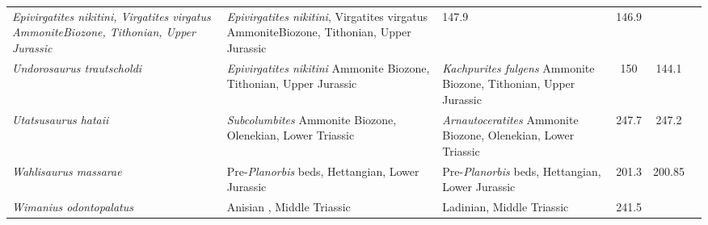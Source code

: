 \begin{longtabu}{>{\itshape}lXXSSl}
        \emph{Epivirgatites nikitini}, Virgatites virgatus AmmoniteBiozone,
        Tithonian, Upper Jurassic                                      &
        \emph{Epivirgatites nikitini}, Virgatites virgatus AmmoniteBiozone,
        Tithonian, Upper Jurassic                                      & 147.9
                                                                       & 146.9
                                                                       &
                                                                       \cite{Efimov1999PZd} \\                    
	Undorosaurus trautscholdi                            &
        \emph{Epivirgatites nikitini} Ammonite Biozone, Tithonian, Upper
        Jurassic                                                          &
        \emph{Kachpurites fulgens} Ammonite Biozone, Tithonian, Upper Jurassic
                                                                          & 150
                                                                          &
        144.1                    & \cite{Arkhangelsky2014PZIR} \\               
	Utatsusaurus hataii                                  &
        \emph{Subcolumbites} Ammonite Biozone, Olenekian, Lower Triassic
                                                             &
        \emph{Arnautoceratites} Ammonite Biozone, Olenekian, Lower Triassic
                                                             & 247.7
                                                             & 247.2
                                                             &
                                                             \cite{Shikama1978SRTUGa} \\                    
	Wahlisaurus massarae                                 &
        Pre-\emph{Planorbis} beds, Hettangian, Lower Jurassic
                                                             &
        Pre-\emph{Planorbis} beds, Hettangian, Lower Jurassic
                                                             & 201.3
                                                             & 200.85
                                                             &
                                                             \cite{Lomax2016JSP} \\                      
	Wimanius odontopalatus                               & Anisian , Middle
        Triassic
                                                             & Ladinian, Middle
        Triassic
                                                             & 241.5

\end{longtabu}
